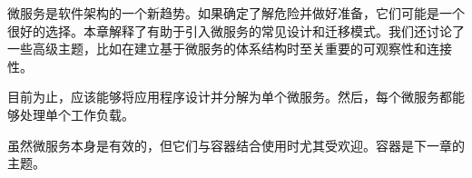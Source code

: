 微服务是软件架构的一个新趋势。如果确定了解危险并做好准备，它们可能是一个很好的选择。本章解释了有助于引入微服务的常见设计和迁移模式。我们还讨论了一些高级主题，比如在建立基于微服务的体系结构时至关重要的可观察性和连接性。

目前为止，应该能够将应用程序设计并分解为单个微服务。然后，每个微服务都能够处理单个工作负载。

虽然微服务本身是有效的，但它们与容器结合使用时尤其受欢迎。容器是下一章的主题。